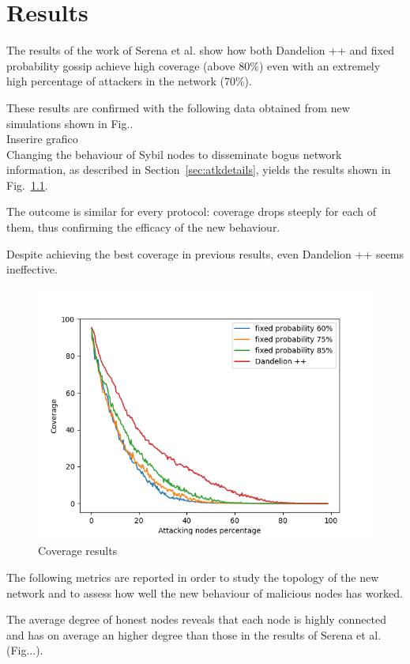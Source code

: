 \chapter{Results}
\label{sec:res}

The results of the work of Serena et al. show how both Dandelion ++ and fixed probability gossip achieve high coverage (above $80\%$) even with an extremely high percentage of attackers in the network ($70\%$)\cite{lunes-dissemination}.

These results are confirmed with the following data obtained from new simulations shown in Fig..\\

Inserire grafico\\

Changing the behaviour of Sybil nodes to disseminate bogus network information, as described in Section~\ref{sec:atkdetails}, yields the results shown in Fig.~\ref{fig:in-cov}.

The outcome is similar for every protocol: coverage drops steeply for each of them, thus confirming the efficacy of the new behaviour.

Despite achieving the best coverage in previous results, even Dandelion ++ seems ineffective.\\

\begin{figure}[h!]
	\includegraphics[width=.7\textwidth]{pict/results/in-cov.png}
	\centering 
	\caption{Coverage results}
	\label{fig:in-cov}
\end{figure}

The following metrics are reported in order to study the topology of the new network and to assess how well the new behaviour of malicious nodes has worked.

The average degree of honest nodes reveals that each node is highly connected and has on average an higher degree than those in the results of Serena et al. (Fig...). \\

